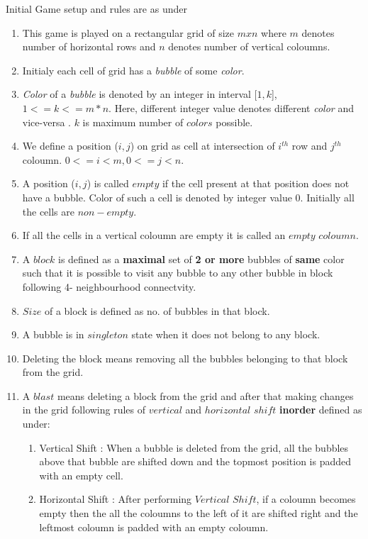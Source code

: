 \documentclass[twoside]{article}
\begin{document}
\begin{multicols}{2}
Initial Game setup and rules are as under 
\begin{enumerate}
\item This game is played on a rectangular grid of size $mxn$ where $m$ denotes number of horizontal rows and $n$ denotes number of vertical coloumns. 
\item Initialy each cell of grid has a \textit{bubble} of some \textit{color}.
\item \textit{Color} of a \textit{bubble} is denoted by an integer in interval [$1,k$], $1<=k<=m*n$. Here, different integer value denotes different \textit{color} and vice-versa . $k$ is maximum number of $colors$ possible. 
\item We define a position ($i,j$) on grid as cell at intersection of $i^{th}$ row and $j^{th}$ coloumn. $0<=i<m , 0<=j<n$.
\item A position ($i,j$) is called $empty$ if the cell present at that position does not have a bubble. Color of such a cell is denoted by integer value 0. Initially all the cells are $non-empty$. 
\item If all the cells in a vertical coloumn are empty it is called an $empty$ $ coloumn$.
\item A $block$ is defined as a \textbf{maximal} set of \textbf{2 or more} bubbles of \textbf{same} color such that it is possible to visit any bubble to any other bubble in block following 4- neighbourhood connectvity.
\item $Size$ of a block is defined as no. of bubbles in that block.
\item A bubble is in  $singleton$ state when it does not belong to any block. 
\item Deleting the block means removing all the bubbles belonging to that block from the grid.
\item A $blast$ means deleting a block from the grid and after that making changes in the grid following rules of $vertical$ and $horizontal$ $shift$ \textbf{inorder} defined as under:
\begin{enumerate}
	\item Vertical Shift : When a bubble is deleted from the grid, all the bubbles above that bubble are shifted down and the topmost position is padded with an empty cell.
	\item Horizontal Shift : After performing $Vertical$ $Shift$, if a coloumn becomes empty then the all the coloumns to the left of it are shifted right and the leftmost coloumn is padded with an empty coloumn. 
\end{enumerate}

\end{enumerate}
\end{multicols}
\end{document}

